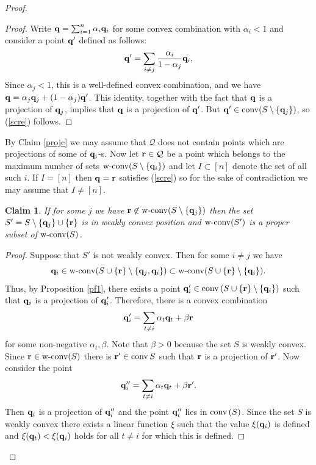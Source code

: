 \documentclass{daj}
\newcommand{\conv}{{\rm conv}\,}
\newcommand{\wc}{\mbox{\rm w-conv}}
\renewcommand{\c}{\mbox{\rm conv}}
\newtheorem{claim}[theorem]{Claim}
\theoremstyle{definition}
\theoremstyle{remark}
\theoremstyle{definition}
\theoremstyle{definition}
\begin{document}
\begin{proof}
\begin{proof}
Write ${\bf q} = \sum_{i=1}^n \alpha_i {\bf q}_i$ for some convex combination with $\alpha_i < 1$ and consider a point ${\bf q}'$ defined as follows:
$$
{\bf q}' = \sum_{i \neq j} \frac{\alpha_i}{1-\alpha_j} {\bf q}_i,
$$
Since $\alpha_j <1$, this is a well-defined convex combination, and we have ${\bf q} = \alpha_j {\bf q}_j + (1-\alpha_j) {\bf q}'$. This identity, together with the fact that ${\bf q}$ is a projection of ${\bf q}_j$, implies that ${\bf q}$ is a projection of ${\bf q}'$. But ${\bf q}' \in \c(S \setminus \{{\bf q}_j\})$, so (\ref{scre}) follows.
\end{proof}

By Claim \ref{projc} we may assume that $\mathcal Q$ does not contain points which are projections of some of ${\bf q}_i$-s. 
Now let ${\bf r} \in \mathcal Q$ be a point which belongs to the maximum number of sets $\wc(S \setminus \{{\bf q}_i\})$ and let $I \subset [n]$ denote the set of all such $i$. If $I = [n]$ then ${\bf q} = {\bf r}$ satisfies (\ref{scre}) so for the sake of contradiction we may assume that $I \neq [n]$.

\begin{claim}\label{cl53}
If for some $j$ we have ${\bf r} \not \in \wc(S \setminus \{{\bf q}_j\})$ then the set $S' = S \setminus \{{\bf q}_j\} \cup \{{\bf r}\}$ is in weakly convex position and $\wc(S')$ is a proper subset of $\wc(S)$.
\end{claim}

\begin{proof} Suppose that $S'$ is not weakly convex. Then for some $i \neq j$ we have 
$$
{\bf q}_i \in \wc(S \cup \{{\bf r}\} \setminus \{{\bf q}_j, {\bf q}_i\} ) \subset \wc(S \cup \{{\bf r}\} \setminus \{{\bf q}_i\}  ).
$$
Thus, by Proposition \ref{pf1}, there exists a point ${\bf q}'_i \in \conv(S \cup \{{\bf r}\} \setminus \{{\bf q}_i\}  )$ such that ${\bf q}_i$ is a projection of ${\bf q}'_i$. Therefore, there is a convex combination
$$
{\bf q}'_i = \sum_{t \neq i} \alpha_t {\bf q}_t + \beta {\bf r}
$$
for some non-negative $\alpha_t, \beta$. 
Note that $\beta > 0$ because the set $S$ is weakly convex. Since ${\bf r} \in \wc(S)$ there is ${\bf r}' \in \conv S$ such that ${\bf r}$ is a projection of ${\bf r}'$. Now consider the point
\begin{equation}\label{qeqn}
    {\bf q}''_i = \sum_{t \neq i} \alpha_t {\bf q}_t + \beta {\bf r}'.
\end{equation}
Then ${\bf q}_i$ is a projection of ${\bf q}_i''$ and the point ${\bf q}_i''$ lies in $\conv(S)$. Since the set $S$ is weakly convex there exists a linear function $\xi$ such that the value $\xi({\bf q}_i)$ is defined and $\xi({\bf q}_t) < \xi({\bf q}_i)$ holds for all $t \neq i$ for which this is defined. 


\end{proof}
\end{proof}
\end{document}
